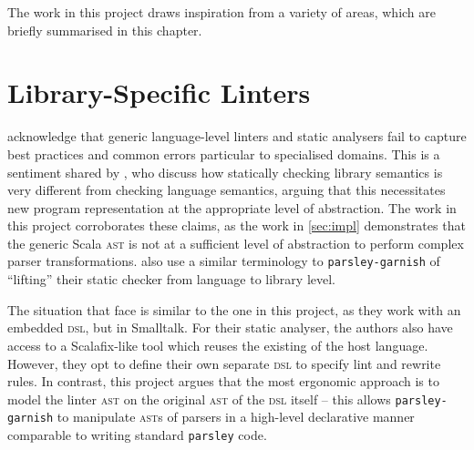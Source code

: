 \documentclass[../../main.tex]{subfiles}
\begin{document}
The work in this project draws inspiration from a variety of areas, which are briefly summarised in this chapter.

\section{Library-Specific Linters}
\textcite{renggli_domain-specific_2010} acknowledge that generic language-level linters and static analysers fail to capture best practices and common errors particular to specialised domains.
This is a sentiment shared by \textcite{gregor_stllint_2006}, who discuss how statically checking library semantics is very different from checking language semantics, arguing that this necessitates new program representation at the appropriate level of abstraction.
The work in this project corroborates these claims, as the work in \cref{sec:impl} demonstrates that the generic Scala \textsc{ast} is not at a sufficient level of abstraction to perform complex parser transformations.
\textcite{gregor_stllint_2006} also use a similar terminology to \texttt{parsley-garnish} of ``lifting'' their static checker from language to library level.

The situation that \textcite{renggli_domain-specific_2010} face is similar to the one in this project, as they work with an embedded \textsc{dsl}, but in Smalltalk.
For their static analyser, the authors also have access to a Scalafix-like tool which reuses the existing  of the host language.
However, they opt to define their own separate \textsc{dsl} to specify lint and rewrite rules.
In contrast, this project argues that the most ergonomic approach is to model the linter \textsc{ast} on the original \textsc{ast} of the \textsc{dsl} itself -- this allows \texttt{parsley-garnish} to manipulate \textsc{ast}s of parsers in a high-level declarative manner comparable to writing standard \texttt{parsley} code.

\end{document}

